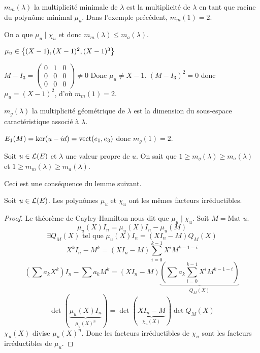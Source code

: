 $m_m(\lambda)$ la multiplicité minimale de $\lambda$ est la multiplicité de $\lambda$ en tant que racine du polynôme minimal $\mu_u$.
Dans l'exemple précédent, $m_m(1) = 2$.

On a que $\mu_u \mid \chi_u$ et donc $m_m(\lambda) \leq m_a(\lambda)$.

$\mu_u \in  \left\{(X-1), (X-1)^2, (X-1)^3\right\}$

$M - I_3 = \begin{pmatrix}
		0 & 1 & 0 \\ 0 & 0 & 0 \\ 0 & 0 & 0
	\end{pmatrix} \neq 0$ Donc $\mu_u \neq X - 1$.
$(M - I_3)^2 = 0$ donc $\mu_u = (X-1)^2$, d'où $m_m(1) = 2$.


$m_g(\lambda)$ la multiplicité géométrique de $\lambda$ est la dimension du sous-espace caractéristique associé à $\lambda$.

$E_1 (M) = \ker (u-id) = \text{vect} (e_1, e_3)$ donc $m_g(1) = 2$.


\begin{prop}
	Soit $u \in \mathcal{L}(E)$ et $\lambda$ une valeur propre de $u$. On sait que $ 1 \geq m_g(\lambda) \geq m_a(\lambda)$ et $1 \geq m_m(\lambda) \geq m_a(\lambda)$.

	Ceci est une conséquence du lemme suivant.
\end{prop}

\begin{lemma}
	Soit $u \in \mathcal{L}(E)$. Les polynômes $\mu_u$ et $\chi_u$ ont les mêmes facteurs irréductibles.
\end{lemma}

\begin{proof}
	Le théorème de Cayley-Hamilton nous dit que $\mu_u \mid \chi_u$. Soit $M = \text {Mat } u$.
	$$\mu_u(X)I_n = \mu_u(X)I_n - \mu_u(M)$$
	$$\exists Q_M (X) \text{ tel que } \mu_u(X) I_n = (XI_n-M)Q_M(X)$$
	$$ X^k I_n - M^k = (XI_n - M) \sum_{i=0}^{k-1} X^i M^{k-1-i} $$
	$$ (\sum a_k X^k)I_n - \sum a_k M^k =(XI_n-M)\underbrace{(\sum a_k \sum_{i=0}^{k-1}X^iM^{k-1-i})}_{Q_M(X)}$$
	$$ \det (\underbrace{\mu_u(X) I_n}_{\mu_u(X)^n}) = \det (\underbrace{XI_n-M}_{\chi_u(X)})\det Q_M(X) $$
	$\chi_u(X)$ divise $\mu_u(X)^n$.
	Donc les facteurs irréductibles de $\chi_u$ sont les facteurs irréductibles de $\mu_u$.

\end{proof}








